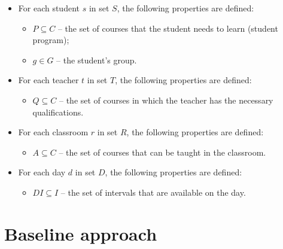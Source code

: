 \documentclass{article}
\begin{document}
\begin{itemize}
    \setlength\itemsep{0.05em}
    \item For each student $s$ in set $S$, the following properties are defined:
    \begin{itemize}
        \setlength\itemsep{0.05em}
        \item $P \subseteq C$ -- the set of courses that the student needs to learn (student program);
        \item $g \in G$ -- the student's group.
    \end{itemize}
    \item For each teacher $t$ in set $T$, the following properties are defined:
    \begin{itemize}
        \setlength\itemsep{0.05em}
        \item $Q \subseteq C$ -- the set of courses in which the teacher has the necessary qualifications.
    \end{itemize}
    \item For each classroom $r$ in set $R$, the following properties are defined:
    \begin{itemize}
        \setlength\itemsep{0.05em}
        \item $A \subseteq C$ -- the set of courses that can be taught in the classroom.
    \end{itemize}
    \item For each day $d$ in set $D$, the following properties are defined:
    \begin{itemize}
        \setlength\itemsep{0.05em}
        \item $DI \subseteq I$ -- the set of intervals that are available on the day.
    \end{itemize}
    
\end{itemize}

\section{Baseline approach}





\end{document}
